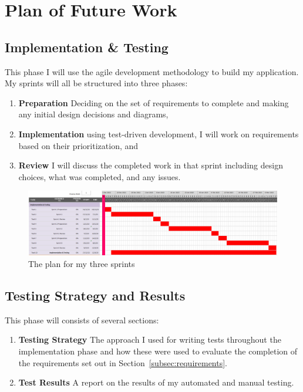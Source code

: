 \section{Plan of Future Work}

\subsection*{Implementation \& Testing}
This phase I will use the agile development methodology to build my application. My sprints will all be structured into three phases:

\begin{enumerate}
  \item \textbf{Preparation} Deciding on the set of requirements to complete and making any initial design decisions and diagrams,
  \item \textbf{Implementation} using test-driven development, I will work on requirements based on their prioritization, and
  \item \textbf{Review} I will discuss the completed work in that sprint including design choices, what was completed, and any issues.  
\end{enumerate}

\begin{figure}[ht]
  \centering
  \includegraphics[width=\textwidth]{assets/images/charts/gantt/implementation-testing.png}
  \caption{The plan for my three sprints}
\end{figure}

\subsection*{Testing Strategy and Results}
This phase will consists of several sections:

\begin{enumerate}
  \item \textbf{Testing Strategy} The approach I used for writing tests throughout the implementation phase and how these were used to evaluate the completion of the requirements set out in Section~\ref{subsec:requirements}. 
  \item \textbf{Test Results} A report on the results of my automated and manual testing.
\end{enumerate}


